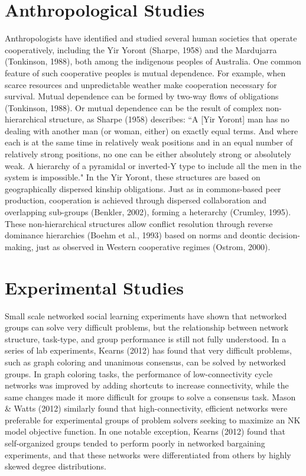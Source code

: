 \section{Anthropological Studies}
Anthropologists have identified and studied several human societies that operate cooperatively, including the Yir Yoront (Sharpe, 1958) and the Mardujarra (Tonkinson, 1988), both among the indigenous peoples of Australia. One common feature of such cooperative peoples is mutual dependence. For example, when scarce resources and unpredictable weather make cooperation necessary for survival. Mutual dependence can be formed by two-way flows of obligations (Tonkinson, 1988). Or mutual dependence can be the result of complex non-hierarchical structure, as Sharpe (1958) describes: ``A [Yir Yoront] man has no dealing with another man (or woman, either) on exactly equal terms. And where each is at the same time in relatively weak positions and in an equal number of relatively strong positions, no one can be either absolutely strong or absolutely weak. A hierarchy of a pyramidal or inverted-Y type to include all the men in the system is impossible." In the Yir Yoront, these structures are based on geographically dispersed kinship obligations. Just as in commons-based peer production, cooperation is achieved through dispersed collaboration and overlapping sub-groups (Benkler, 2002), forming a heterarchy (Crumley, 1995). These non-hierarchical structures allow conflict resolution through reverse dominance hierarchies (Boehm et al., 1993) based on norms and deontic decision-making, just as observed in Western cooperative regimes (Ostrom, 2000).

\section{Experimental Studies}
Small scale networked social learning experiments have shown that networked groups can solve very difficult problems, but the relationship between network structure, task-type, and group performance is still not fully understood. In a series of lab experiments, Kearns (2012) has found that very difficult problems, such as graph coloring and unanimous consensus, can be solved by networked groups. In graph coloring tasks, the performance of low-connectivity cycle networks was improved by adding shortcuts to increase connectivity, while the same changes made it more difficult for groups to solve a consensus task. Mason \& Watts (2012) similarly found that high-connectivity, efficient networks were preferable for experimental groups of problem solvers seeking to maximize an NK model objective function. In one notable exception, Kearns (2012) found that self-organized groups tended to perform poorly in networked bargaining experiments, and that these networks were differentiated from others by highly skewed degree distributions.

